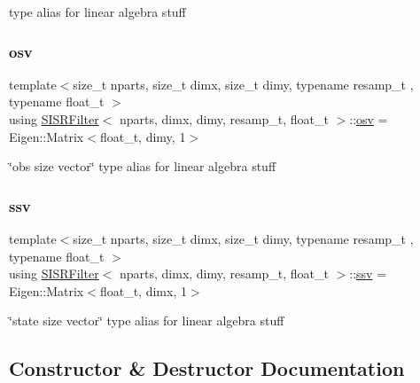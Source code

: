 type alias for linear algebra stuff \mbox{\label{classSISRFilter_a5b762e9352857a9e48db3932191887ef}} 
\subsubsection{\texorpdfstring{osv}{osv}}
{\footnotesize\ttfamily template$<$size\+\_\+t nparts, size\+\_\+t dimx, size\+\_\+t dimy, typename resamp\+\_\+t , typename float\+\_\+t $>$ \\
using \hyperlink{classSISRFilter}{S\+I\+S\+R\+Filter}$<$ nparts, dimx, dimy, resamp\+\_\+t, float\+\_\+t $>$\+::\hyperlink{classSISRFilter_a5b762e9352857a9e48db3932191887ef}{osv} =  Eigen\+::\+Matrix$<$float\+\_\+t, dimy, 1$>$}

\char`\"{}obs size vector\char`\"{} type alias for linear algebra stuff \mbox{\label{classSISRFilter_abfec45cf57ea6fadae4a9da8b0042351}} 
\subsubsection{\texorpdfstring{ssv}{ssv}}
{\footnotesize\ttfamily template$<$size\+\_\+t nparts, size\+\_\+t dimx, size\+\_\+t dimy, typename resamp\+\_\+t , typename float\+\_\+t $>$ \\
using \hyperlink{classSISRFilter}{S\+I\+S\+R\+Filter}$<$ nparts, dimx, dimy, resamp\+\_\+t, float\+\_\+t $>$\+::\hyperlink{classSISRFilter_abfec45cf57ea6fadae4a9da8b0042351}{ssv} =  Eigen\+::\+Matrix$<$float\+\_\+t, dimx, 1$>$}

\char`\"{}state size vector\char`\"{} type alias for linear algebra stuff 

\subsection{Constructor \& Destructor Documentation}
\mbox{\label{classSISRFilter_a46243d4a5ef93f3762d1130fa4d43389}} 
